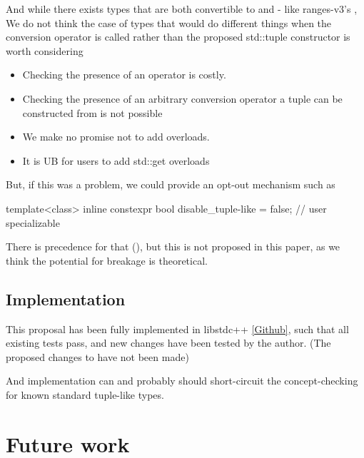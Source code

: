\documentclass{wg21}
\begin{document}
And while there exists types that are both convertible to  and  - like ranges-v3's ,
We do not think the case of types that would do different things when the conversion operator is called rather than the proposed 
std::tuple constructor is worth considering

\begin{itemize}
    \item Checking the presence of an operator  is costly.
    \item Checking the presence of an arbitrary conversion operator a tuple can be constructed from is not possible
    \item We make no promise not to add overloads.
    \item It is UB for users to add std::get overloads
\end{itemize}

But, if this was a problem, we could provide an opt-out mechanism such as

\begin{colorblock}
    template<class>
    inline constexpr bool disable_tuple-like = false; // user specializable
\end{colorblock}

There is precedence for that (), but this is not proposed in this paper,
as we think the potential for breakage is theoretical.

\subsection{Implementation}

This proposal has been fully implemented in libstdc++ \href{https://github.com/cor3ntin/gcc/tree/tuple_pair2}{[Github]},
such that all existing tests pass, and new changes have been tested by the author. (The proposed changes to  have not been made)

\begin{note}
And implementation can and probably should short-circuit the  concept-checking for known standard tuple-like types.
\end{note}

\section{Future work}
\end{document}
